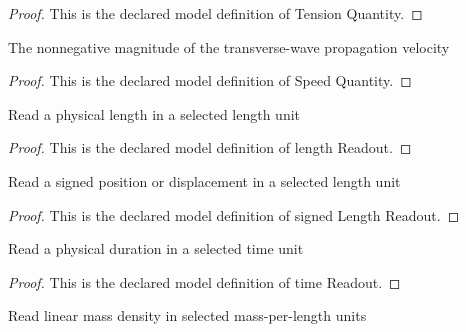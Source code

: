 \begin{proof}
  This is the declared model definition of Tension Quantity.
\end{proof}
\begin{definition}
  \label{def:physics:phyx-mini-0291:phyxminiproblems-problemphyxmini0291-speedquantity}
  The nonnegative magnitude of the transverse-wave propagation velocity
\end{definition}
\begin{proof}
  This is the declared model definition of Speed Quantity.
\end{proof}
\begin{definition}
  \label{def:physics:phyx-mini-0291:phyxminiproblems-problemphyxmini0291-lengthreadout}
  Read a physical length in a selected length unit
\end{definition}
\begin{proof}
  This is the declared model definition of length Readout.
\end{proof}
\begin{definition}
  \label{def:physics:phyx-mini-0291:phyxminiproblems-problemphyxmini0291-signedlengthreadout}
  Read a signed position or displacement in a selected length unit
\end{definition}
\begin{proof}
  This is the declared model definition of signed Length Readout.
\end{proof}
\begin{definition}
  \label{def:physics:phyx-mini-0291:phyxminiproblems-problemphyxmini0291-timereadout}
  Read a physical duration in a selected time unit
\end{definition}
\begin{proof}
  This is the declared model definition of time Readout.
\end{proof}
\begin{definition}
  \label{def:physics:phyx-mini-0291:phyxminiproblems-problemphyxmini0291-linearmassdensityreadout}
  Read linear mass density in selected mass-per-length units
\end{definition}
